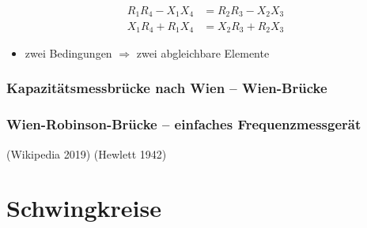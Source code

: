 \documentclass[
  ngerman,
  letterpaper,
]{scrbook}
\providecommand{\tightlist}{%
  \setlength{\itemsep}{0pt}\setlength{\parskip}{0pt}}
\begin{document}
\begin{align}
R_1 R_4 - X_1 X_4 &= R_2 R_3 - X_2 X_3 \\
X_1 R_4 + R_1 X_4 &= X_2 R_3 + R_2 X_3
\end{align}

\begin{itemize}
\tightlist
\item
  zwei Bedingungen \(\Rightarrow\) zwei abgleichbare Elemente
\end{itemize}

\subsection{Kapazitätsmessbrücke nach Wien --
Wien-Brücke}\label{kapazituxe4tsmessbruxfccke-nach-wien-wien-bruxfccke}

\subsection{Wien-Robinson-Brücke -- einfaches
Frequenzmessgerät}\label{wien-robinson-bruxfccke-einfaches-frequenzmessgeruxe4t}

(Wikipedia 2019) (Hewlett 1942)

\chapter{Schwingkreise}\label{schwingkreise}
\end{document}
